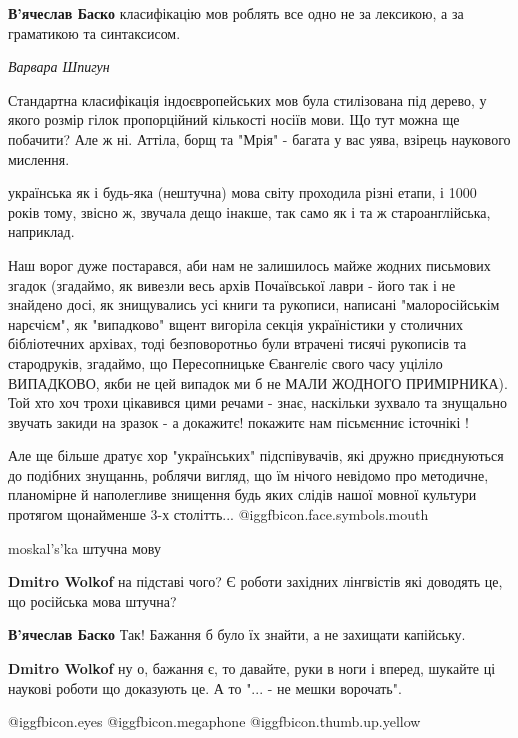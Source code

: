 \begin{itemize}
\begin{itemize}
\begin{itemize}
\textbf{В'ячеслав Баско} класифікацію мов роблять все одно не за лексикою, а за граматикою та синтаксисом.

\end{itemize} %

\end{itemize} %

\emph{Варвара Шпигун}

Стандартна класифікація індоєвропейських мов була стилізована під дерево, у
якого розмір гілок пропорційний кількості носіїв мови. Що тут можна ще
побачити? Але ж ні. Аттіла, борщ та "Мрія" - багата у вас уява, взірець
наукового мислення.


українська як і будь-яка (нештучна) мова світу проходила різні етапи, і 1000
років тому, звісно ж, звучала дещо інакше, так само як і та ж староанглійська,
наприклад.

Наш ворог дуже постарався, аби нам не залишилось майже жодних письмових згадок
(згадаймо, як вивезли весь архів Почаївської лаври - його так і не знайдено
досі, як знищувались усі книги та рукописи, написані "малоросійськім нарєчієм",
як "випадково" вщент вигоріла секція україністики у столичних бібліотечних
архівах, тоді безповоротньо були втрачені тисячі рукописів та стародруків,
згадаймо, що Пересопницьке Євангеліє свого часу уціліло ВИПАДКОВО, якби не цей
випадок ми б не МАЛИ ЖОДНОГО ПРИМІРНИКА). Той хто хоч трохи цікавився цими
речами - знає, наскільки зухвало та знущально звучать закиди на зразок - а
докажитє! покажитє нам пісьмєнниє істочнікі !

Але ще більше дратує хор "українських" підспівувачів, які дружно приєднуються
до подібних знущаннь, роблячи вигляд, що їм нічого невідомо про методичне,
планомірне й наполегливе знищення будь яких слідів нашої мовної культури
протягом щонайменше 3-х столітть...   @igg{fbicon.face.symbols.mouth} 

moskal's'ka штучна мову

\begin{itemize} %
\textbf{Dmitro Wolkof} на підставі чого? Є роботи західних лінгвістів які доводять це, що російська мова штучна?

\begin{itemize} %
\textbf{В'ячеслав Баско} Так! Бажання б було їх знайти, а не захищати капійську.

\textbf{Dmitro Wolkof} ну о, бажання є, то давайте, руки в ноги і вперед, шукайте ці наукові роботи що доказують це. А то "... - не мешки ворочать".
\end{itemize} %

\end{itemize} %

 @igg{fbicon.eyes}  @igg{fbicon.megaphone}  @igg{fbicon.thumb.up.yellow} 

\end{itemize} %
